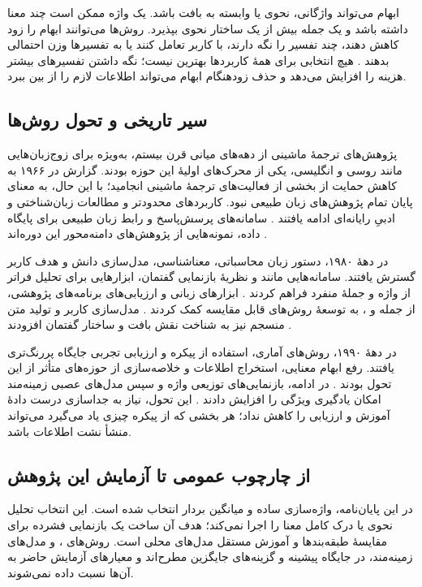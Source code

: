 ابهام می‌تواند واژگانی، نحوی یا وابسته به بافت باشد. یک واژه ممکن است چند معنا داشته باشد و یک جمله بیش از یک ساختار نحوی بپذیرد. روش‌ها می‌توانند ابهام را زود کاهش دهند، چند تفسیر را نگه دارند، با کاربر تعامل کنند یا به تفسیرها وزن احتمالی بدهند \cite{ref27}. هیچ انتخابی برای همۀ کاربردها بهترین نیست؛ نگه داشتن تفسیرهای بیشتر هزینه را افزایش می‌دهد و حذف زودهنگام ابهام می‌تواند اطلاعات لازم را از بین ببرد.

\subsection{سیر تاریخی و تحول روش‌ها}
پژوهش‌های ترجمۀ ماشینی از دهه‌های میانی قرن بیستم، به‌ویژه برای زوج‌زبان‌هایی مانند روسی و انگلیسی، یکی از محرک‌های اولیۀ این حوزه بودند. گزارش  در ۱۹۶۶ به کاهش حمایت از بخشی از فعالیت‌های ترجمۀ ماشینی انجامید؛ با این حال، به معنای پایان تمام پژوهش‌های زبان طبیعی نبود. کاربردهای محدودتر و مطالعات زبان‌شناختی و ادبیِ رایانه‌ای ادامه یافتند \cite{ref28,ref29}. سامانه‌های پرسش‌پاسخ و رابط زبان طبیعی برای پایگاه داده، نمونه‌هایی از پژوهش‌های دامنه‌محور این دوره‌اند \cite{ref30,ref31,ref32}.

در دهۀ ۱۹۸۰، دستور زبان محاسباتی، معناشناسی، مدل‌سازی دانش و هدف کاربر گسترش یافتند. سامانه‌هایی مانند  و نظریۀ بازنمایی گفتمان، ابزارهایی برای تحلیل فراتر از واژه و جملۀ منفرد فراهم کردند \cite{ref33,ref34}. ابزارهای زبانی و ارزیابی‌های برنامه‌های پژوهشی، از جمله  و ، به توسعۀ روش‌های قابل مقایسه کمک کردند \cite{ref35,ref36,ref37}. مدل‌سازی کاربر و تولید متن منسجم نیز به شناخت نقش بافت و ساختار گفتمان افزودند \cite{ref38,ref39,ref40}.

در دهۀ ۱۹۹۰، روش‌های آماری، استفاده از پیکره و ارزیابی تجربی جایگاه پررنگ‌تری یافتند. رفع ابهام معنایی، استخراج اطلاعات و خلاصه‌سازی از حوزه‌های متأثر از این تحول بودند \cite{ref41,ref42,ref43}. در ادامه، بازنمایی‌های توزیعی واژه و سپس مدل‌های عصبی زمینه‌مند امکان یادگیری ویژگی را افزایش دادند \cite{ref78,ref81,ref82}. این تحول، نیاز به جداسازی درست دادۀ آموزش و ارزیابی را کاهش نداد؛ هر بخشی که از پیکره چیزی یاد می‌گیرد می‌تواند منشأ نشت اطلاعات باشد.

\subsection{از چارچوب عمومی تا آزمایش این پژوهش}
در این پایان‌نامه، واژه‌سازی ساده و میانگین بردار  انتخاب شده است. این انتخاب تحلیل نحوی یا درک کامل معنا را اجرا نمی‌کند؛ هدف آن ساخت یک بازنمایی فشرده برای مقایسۀ طبقه‌بندها و آموزش مستقل مدل‌های محلی است. روش‌های ،  و مدل‌های زمینه‌مند، در جایگاه پیشینه و گزینه‌های جایگزین مطرح‌اند و معیارهای آزمایش حاضر به آن‌ها نسبت داده نمی‌شوند.

